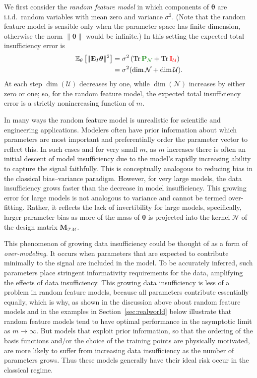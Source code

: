 \documentclass[twocolumn,aps,prx,superscriptaddress,10pt]{revtex4-2}
\newcommand{\0}{\bm{0}}
\newcommand{\btheta}{\boldsymbol{\theta}}
\newcommand{\M}{\mathcal{M}} %
\newcommand{\K}{\mathcal{N}} %
\newcommand{\T}{\mathcal{T}} %
\newcommand{\U}{\mathcal{U}} %
\newcommand{\bbIU}{{\color{red}{\bbI_{\U}}}}  %
\newcommand{\bbPN}{{\color{Green}{\mathbf{P}_{\K}}}} %
\newcommand{\bbE}{\mathbf{E}}
\newcommand{\bbI}{\mathbf{I}}
\newcommand{\bbM}{\mathbf{M}}
\newcommand{\MTM}{\bbM_{\T\M}}
\DeclareMathOperator{\Tr}{Tr}
\newcommand{\ev}{\mathbb{E}} %
\begin{document}
We first consider  the \emph{random feature model} in which components of $\btheta$ are i.i.d.~random variables with mean zero and variance $\sigma^2$. (Note that the random feature model is sensible only when the parameter space has finite dimension, otherwise the norm $\|\btheta\|$ would be infinite.)
In this setting the expected total insufficiency error is
\begin{align}
\ev_\theta\left[ \|  \bbE_I  \btheta \|^2 \right] & =  \sigma^2 \left( \Tr \bbPN + \Tr \bbIU \right) \\
& = \sigma^2 ( \dim \K  + \dim \U ).
\end{align}
At each step $\dim(\U)$ decreases by one, while $\dim(\K)$ increases by either zero or one; so, for the random feature model, the expected total insufficiency error is a strictly nonincreasing function of $m$.

In many ways the random feature model is unrealistic for scientific and engineering applications.  
Modelers often have prior information about which parameters are most important and preferentially order the parameter vector to reflect this.
In such cases and for very small $m$, as $m$ increases there is often an initial descent of model insufficiency due to the model's rapidly increasing ability to capture the signal faithfully.
This is conceptually analogous to reducing bias in the classical bias--variance paradigm. 
However, for very large models, the data insufficiency grows faster than the decrease in model insufficiency.
This growing error for large models is not analogous to variance and cannot be termed over-fitting.
Rather, it reflects the lack of invertibility for large models, specifically, larger parameter bias as more of the mass of $\btheta$ is projected into the kernel $\K$ of the design matrix $\MTM$.


This phenomenon of growing data insufficiency could be thought of as a form of  \emph{over-modeling}.
It occurs when parameters that are expected to contribute minimally to the signal are included in the model.
To be accurately inferred, such parameters place stringent informativity requirements for the data, amplifying the effects of data insufficiency.
This growing data insufficiency is less of a problem in random feature models, because all parameters contribute  essentially equally, which is why, as shown in the discussion above about random feature models and in the examples in Section~\ref{sec:realworld} below illustrate that random feature models tend to have optimal performance in the asymptotic limit as $m\to \infty$.  
But models that exploit prior information, so that the ordering of the basis functions and/or the choice of the training points are physically motivated, are more likely to suffer from increasing data insufficiency as the number of parameters grows.  Thus these models generally  have their ideal risk occur in the classical regime.
\end{document}
